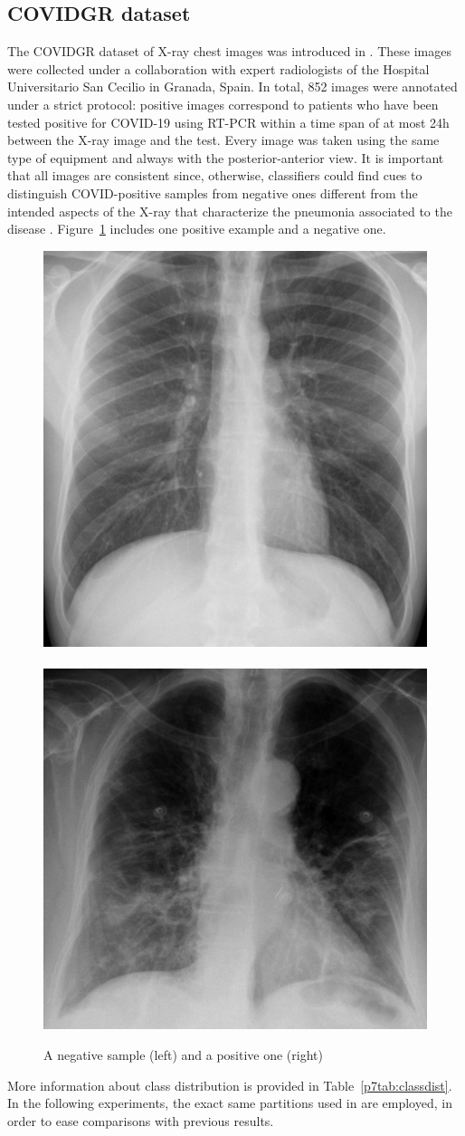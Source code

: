 \subsection{COVIDGR dataset}

The COVIDGR dataset of X-ray chest images was introduced in \cite{9254002}. These images were collected under a collaboration with expert radiologists of the Hospital Universitario San Cecilio in Granada, Spain. In total, 852 images were annotated under a strict protocol: positive images correspond to patients who have been tested positive for COVID-19 using RT-PCR within a time span of at most 24h between the X-ray image and the test. Every image was taken using the same type of equipment and always with the posterior-anterior view. It is important that all images are consistent since, otherwise, classifiers could find cues to distinguish COVID-positive samples from negative ones different from the intended aspects of the X-ray that characterize the pneumonia associated to the disease \cite{MAGUOLO20211}. Figure~\ref{p7fig:covidgrsamples} includes one positive example and a negative one. 

\begin{figure}
    \centering
    \includegraphics[height=.33\linewidth]{Negativa-min.eps}~~
    \includegraphics[height=.33\linewidth]{Severa-min.eps}
    
    \caption{A negative sample (left) and a positive one (right)}
    \label{p7fig:covidgrsamples}
\end{figure}

More information about class distribution is provided in Table~\ref{p7tab:classdist}. In the following experiments, the exact same partitions used in \cite{9254002} are employed, in order to ease comparisons with previous results.


